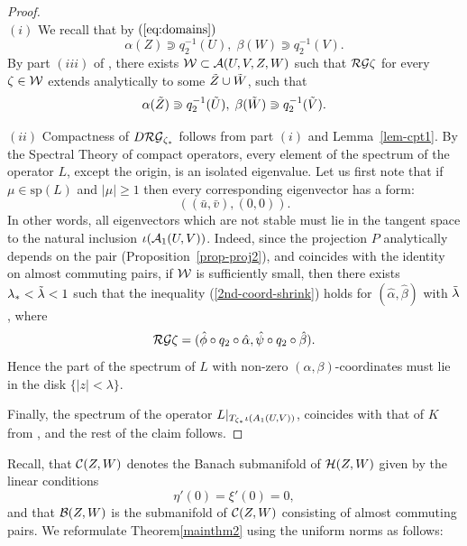 \begin{proof} $\phantom{a}$ \\
\medskip
\noindent $(i)$ We recall that by $(\ref{eq:domains})$
$$\alpha(Z)\Supset q_2^{-1}(U),\;\beta(W)\Supset q_2^{-1}(V).$$
 By  part  $(iii)$   of  , there exists  $\mathcal{W} \subset \mathcal{A}(U,V,Z,W)$ such that  $\mathcal{RG} \zeta$  for every $\zeta \in \mathcal{W}$  extends analytically to some $\tilde Z  \cup \tilde W$, such that
$$\alpha(\tilde Z)\Supset q_2^{-1}(\tilde U),\;\beta(\tilde W) \Supset q_2^{-1}(\tilde V).$$


\noindent $(ii)$  Compactness of $D\mathcal{RG}_{\zeta_*}$ follows from part $(i)$ and Lemma~\ref{lem-cpt1}. By the Spectral Theory of compact operators, every element of the spectrum of the operator $L$, except the origin,  is an isolated eigenvalue. Let us first note that if $\mu\in\text{sp}(L)$ and $|\mu|\geq 1$ then every corresponding eigenvector has a form:
$$((\bar u,\bar v), (0, 0)).$$
In other words, all eigenvectors which are not stable must lie in the tangent space to the natural inclusion 
$\iota(\mathcal{A}_1(U,V))$. 
Indeed, since the projection $P$  analytically depends on the pair (Proposition~\ref{prop-proj2}), and coincides with the identity on almost commuting pairs, if $\mathcal{W}$ is sufficiently small, then there exists $\lambda_* <\tilde \lambda <1$ such that  the inequality (\ref{2nd-coord-shrink}) holds for $(\hat{\alpha},\hat{\beta})$ with $\tilde \lambda$, where 
$$\mathcal{RG} \zeta=( \hat{\phi} \circ q_2 \circ \hat{\alpha}, \hat{\psi} \circ q_2 \circ \hat{\beta}).$$ 
Hence the part of the spectrum of $L$ with non-zero $(\alpha,\beta)$-coordinates must lie in the disk $\{|z|<\lambda\}$.

Finally, the spectrum of the operator $L \arrowvert_{T_{\zeta_*}\iota(A_1(U,V))}$, coincides with that of $K$ from , and the rest of the claim follows.

\end{proof}


Recall, that $\mathcal{C}(Z,W)$ denotes the Banach submanifold of $\mathcal{H}(Z,W)$ given by the linear conditions 
$$\eta'(0)=\xi'(0)=0,$$ and that $\mathcal{B}(Z,W)$ is the submanifold of $\mathcal{C}(Z,W)$ consisting of almost commuting pairs. We reformulate Theorem\ref{mainthm2}  using the uniform norms as follows:

